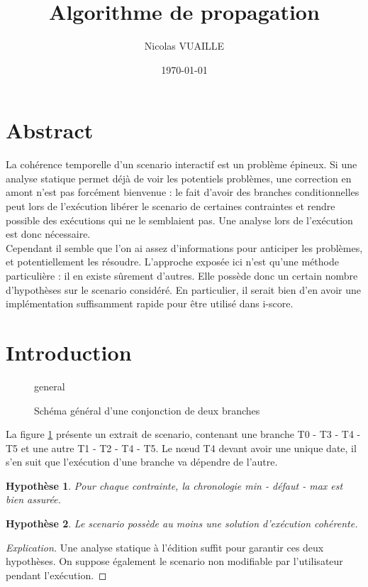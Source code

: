 \documentclass[10pt,a4paper]{article}
\author{Nicolas VUAILLE}
\title{Algorithme de propagation}
\date{\today}
\newtheorem{presup}{Hypothèse}
\begin{document}
\maketitle

\section*{Abstract}

La cohérence temporelle d'un scenario interactif est un problème épineux. Si une analyse statique permet déjà de voir les potentiels problèmes, une correction en amont n'est pas forcément bienvenue : le fait d'avoir des branches conditionnelles peut lors de l'exécution libérer le scenario de certaines contraintes et rendre possible des exécutions qui ne le semblaient pas. Une analyse lors de l'exécution est donc nécessaire. \\

Cependant il semble que l'on ai assez d'informations pour anticiper les problèmes, et potentiellement les résoudre. L'approche exposée ici n'est qu'une méthode particulière : il en existe sûrement d'autres. Elle possède donc un certain nombre d'hypothèses sur le scenario considéré. En particulier, il serait bien d'en avoir une implémentation suffisamment rapide pour être utilisé dans i-score. \\

\section{Introduction}

	\begin{figure}[h]
		\centering
		
		\schemaScenario general
		\caption{Schéma général d'une conjonction de deux branches}
		\label{S:general}
	\end{figure}

La figure \ref{S:general} présente un extrait de scenario, contenant une branche T0 - T3 - T4 - T5 et une autre T1 - T2 - T4 - T5. Le nœud T4 devant avoir une unique date, il s'en suit que l'exécution d'une branche va dépendre de l'autre.

	\begin{presup}
		Pour chaque contrainte, la chronologie min - défaut - max est bien assurée.
		\label{P:Chronologie}
	\end{presup}
	\begin{presup}
		Le scenario possède au moins une solution d'exécution cohérente.
		\label{P:Executabilite}
	\end{presup}
	\begin{proof}[Explication]
		Une analyse statique à l'édition suffit pour garantir ces deux hypothèses. On suppose également le scenario non modifiable par l'utilisateur pendant l'exécution.
	\end{proof}
\end{document}

